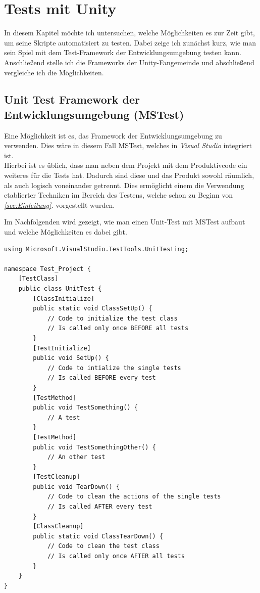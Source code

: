 \chapter{Tests mit Unity}
\label{sec:Tests mit Unity}

In diesem Kapitel möchte ich untersuchen, welche Möglichkeiten es zur Zeit gibt, um seine Skripte automatisiert zu testen. Dabei zeige ich zunächst kurz, wie man sein Spiel mit dem Test-Framework der Entwicklungsumgebung testen kann. Anschließend stelle ich die Frameworks der Unity-Fangemeinde und abschließend vergleiche ich die Möglichkeiten.

\section{Unit Test Framework der Entwicklungsumgebung (MSTest)}

Eine Möglichkeit ist es, das Framework der Entwicklungsumgebung zu verwenden. Dies wäre in diesem Fall MSTest, welches in \textit{Visual Studio} integriert ist.\\
Hierbei ist es üblich, dass man neben dem Projekt mit dem Produktivcode ein weiteres für die Tests hat. Dadurch sind diese und das Produkt sowohl räumlich, als auch logisch voneinander getrennt. Dies ermöglicht einem die Verwendung etablierter Techniken im Bereich des Testens, welche schon zu Beginn von \textit{\ref{sec:Einleitung}. } vorgestellt wurden.

Im Nachfolgenden wird gezeigt, wie man einen Unit-Test mit MSTest aufbaut und welche Möglichkeiten es dabei gibt.

\pagebreak
\begin{lstlisting}[caption={[Unit Test mit MSTest]Unit Test mit MSTest\\
Beispiel einer Testklasse in MSTest. Zeigt wie man ihre Testmethoden deklariert und wie sie initialisiert wird.}, label=code:UnitTestMitMSTest]
using Microsoft.VisualStudio.TestTools.UnitTesting;

namespace Test_Project {
	[TestClass]
	public class UnitTest {
		[ClassInitialize]
		public static void ClassSetUp() {
			// Code to initialize the test class
			// Is called only once BEFORE all tests
		}
		[TestInitialize]
		public void SetUp() {
			// Code to intialize the single tests
			// Is called BEFORE every test
		}
		[TestMethod]
		public void TestSomething() {
			// A test
		}			
		[TestMethod]
		public void TestSomethingOther() {
			// An other test
		}
		[TestCleanup]
		public void TearDown() {
			// Code to clean the actions of the single tests
			// Is called AFTER every test
		}
		[ClassCleanup]
		public static void ClassTearDown() {
			// Code to clean the test class
			// Is called only once AFTER all tests
		}
	}
}
\end{lstlisting}
\pagebreak

